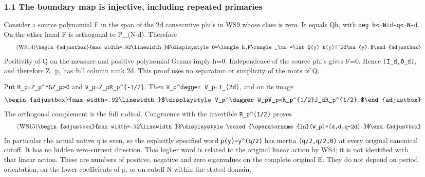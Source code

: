 \documentclass[11pt]{article}
\begin{document}
\subsubsection{1.1 The boundary map is injective, including repeated primaries}\label{part3-the-boundary-map-is-injective-including-repeated-primaries}

Consider a source polynomial F in the span of the 2d consecutive phi's in WS9 whose class is zero. It equals Qh, with \texttt{deg h\textless{}=\allowbreak{}N+d-q\textless{}=\allowbreak{}N-d}. On the other hand F is orthogonal to P\_(N-d). Therefore 
\begin{equation*}
\tag{WS14}
\begin{adjustbox}{max width=.92\linewidth}$\displaystyle 0=\langle h,F\rangle_\mu=\int Q(y)|h(y)|^2d\mu(y).$\end{adjustbox}
\end{equation*}
 Positivity of Q on the measure and positive polynomial Grams imply h=0. Independence of the source phi's gives F=0. Hence \texttt{{[}I\_\allowbreak{}d,\allowbreak{}O\_\allowbreak{}d{]}}, and therefore Z\_p, has full column rank 2d. This proof uses no separation or simplicity of the roots of Q.

Put \texttt{R\_\allowbreak{}p=\allowbreak{}Z\_\allowbreak{}p\^{}*GZ\_\allowbreak{}p\textgreater{}0} and \texttt{V\_\allowbreak{}p=\allowbreak{}Z\_\allowbreak{}pR\_\allowbreak{}p\^{}\{-1/\allowbreak{}2\}}. Then \texttt{V\_\allowbreak{}p\^{}dagger V\_\allowbreak{}p=\allowbreak{}I\_\allowbreak{}(2d)}, and on its image 
\begin{equation*}
\begin{adjustbox}{max width=.92\linewidth}$\displaystyle V_p^\dagger W_pV_p=R_p^{1/2}J_dR_p^{1/2}.$\end{adjustbox}
\end{equation*}
 The orthogonal complement is the full radical. Congruence with the invertible \texttt{R\_\allowbreak{}p\^{}(1/\allowbreak{}2)} proves 
\begin{equation*}
\tag{WS15}
\begin{adjustbox}{max width=.92\linewidth}$\displaystyle \boxed{\operatorname{In}(W_p)=(d,d,q-2d).}$\end{adjustbox}
\end{equation*}
 In particular the actual native q is even, so the explicitly specified word \texttt{p(y)=\allowbreak{}y\^{}(q/\allowbreak{}2)} has inertia \texttt{(q/\allowbreak{}2,\allowbreak{}q/\allowbreak{}2,\allowbreak{}0)} at every original canonical cutoff. It has no hidden zero-current direction. This higher word is related to the original linear action by WS4; it is not identified with that linear action. These are numbers of positive, negative and zero eigenvalues on the complete original E. They do not depend on period orientation, on the lower coefficients of p, or on cutoff N within the stated domain.
\end{document}
